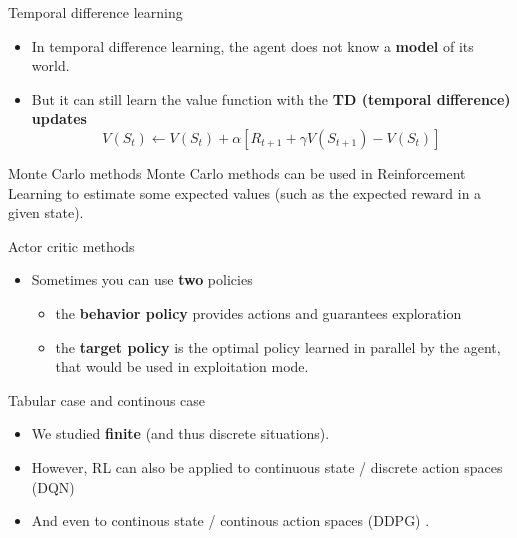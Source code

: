 \documentclass[usenames,dvipsnames]{beamer}
\begin{document}
\begin{frame}{Temporal difference learning}
\begin{itemize}
    \item In temporal difference learning, the agent does not know a
        \textbf{{model}} of its world.
    \item But it can still learn the value function with the \textbf{{TD (temporal difference)
        updates}} 
    \begin{equation} V(S_t)\leftarrow
V(S_t)+\alpha[R_{t+1}+\gamma V(S_{t+1})-V(S_t)] \label{eq:td0}
    \end{equation}
\end{itemize}
\end{frame}


\begin{frame}{Monte Carlo methods}
    Monte Carlo methods can be used in Reinforcement Learning to estimate
        some expected values (such as the expected
        reward in a given state).
\end{frame}

%     

%    

\begin{frame}{Actor critic methods}
\begin{itemize}
    \item Sometimes you can use \textbf{{two}} policies
        \begin{itemize}
            \item the \textbf{{behavior policy}} provides actions and guarantees
                exploration
            \item the \textbf{{target policy}} is the optimal policy learned in
                parallel by the agent, that would be used in exploitation mode.
        \end{itemize}
\end{itemize}    
\end{frame}

\begin{frame}{Tabular case and continous case}
   \begin{itemize}
       \item We studied \textbf{{finite}} (and thus discrete situations).
        \item However, RL can also be applied to continuous state / discrete
            action spaces (DQN) 
        \item And even to continous state / continous action spaces (DDPG)
            \cite{Bengio2009} .
   \end{itemize} 
\end{frame}
\end{document}
